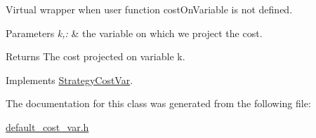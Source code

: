 \-Virtual wrapper when user function cost\-On\-Variable is not defined. 


\begin{DoxyParams}{\-Parameters}
{\em k,\-:} & the variable on which we project the cost. \\
\hline
\end{DoxyParams}
\begin{DoxyReturn}{\-Returns}
\-The cost projected on variable k. 
\end{DoxyReturn}


\-Implements \hyperlink{classStrategyCostVar_a8381829dfa84b3460822aa0e3677a443}{\-Strategy\-Cost\-Var}.



\-The documentation for this class was generated from the following file\-:\begin{DoxyCompactItemize}
\item 
\hyperlink{default__cost__var_8h}{default\-\_\-cost\-\_\-var.\-h}\end{DoxyCompactItemize}
